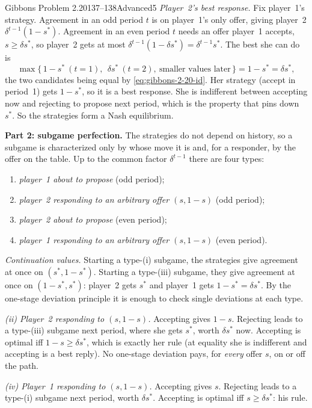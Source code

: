 \begin{exsol}{Gibbons Problem 2.20}{137--138}{Advanced}{5}
\emph{Player~2's best response.} Fix player~1's strategy. Agreement in an odd period $t$ is on
player~1's only offer, giving player~2 $\delta^{t-1}(1 - s^*)$. Agreement in an even period $t$ needs an
offer player~1 accepts, $s \ge \delta s^*$, so player~2 gets at most $\delta^{t-1}(1 - \delta s^*) =
\delta^{t-1}s^*$. The best she can do is
\[
  \max\{\,1 - s^*\ (t=1),\ \ \delta s^*\ (t=2),\ \text{smaller values later}\,\} = 1 - s^* = \delta s^* ,
\]
the two candidates being equal by \eqref{eq:gibbons-2-20-id}. Her strategy (accept in period~1) gets
$1 - s^*$, so it is a best response. She is indifferent between accepting now and rejecting to
propose next period, which is the property that pins down $s^*$. So the strategies form a Nash
equilibrium.

\textbf{Part 2: subgame perfection.} The strategies do not depend on history, so a subgame is
characterized only by whose move it is and, for a responder, by the offer on the table. Up to the
common factor $\delta^{t-1}$ there are four types:
\begin{enumerate}[label=(\roman*)]
  \item \emph{player~1 about to propose} (odd period);
  \item \emph{player~2 responding to an arbitrary offer $(s, 1-s)$} (odd period);
  \item \emph{player~2 about to propose} (even period);
  \item \emph{player~1 responding to an arbitrary offer $(s, 1-s)$} (even period).
\end{enumerate}
\emph{Continuation values.} Starting a type-(i) subgame, the strategies give agreement at once on
$(s^*, 1-s^*)$. Starting a type-(iii) subgame, they give agreement at once on $(1-s^*, s^*)$: player~2
gets $s^*$ and player~1 gets $1-s^* = \delta s^*$. By the one-stage deviation principle it is enough
to check single deviations at each type.

\emph{(ii) Player~2 responding to $(s, 1-s)$.} Accepting gives $1-s$. Rejecting leads to a type-(iii)
subgame next period, where she gets $s^*$, worth $\delta s^*$ now. Accepting is optimal iff
$1 - s \ge \delta s^*$, which is exactly her rule (at equality she is indifferent and accepting is a best
reply). No one-stage deviation pays, for \emph{every} offer $s$, on or off the path.

\emph{(iv) Player~1 responding to $(s, 1-s)$.} Accepting gives $s$. Rejecting leads to a type-(i)
subgame next period, worth $\delta s^*$. Accepting is optimal iff $s \ge \delta s^*$: his rule.


\end{exsol}
